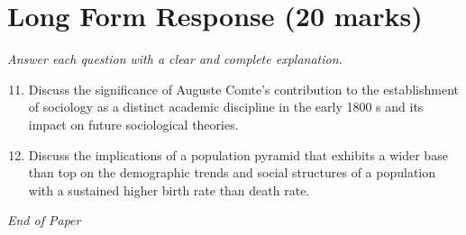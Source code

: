 \documentclass[12pt]{article}
\begin{document}
\section*{Long Form Response (20 marks)}
\textit{Answer each question with a clear and complete explanation.}
\begin{enumerate}[label=\arabic*.]
\setcounter{enumi}{10}
\item Discuss the significance of Auguste Comte's contribution to the establishment of sociology as a distinct academic discipline in the early 1800 s and its impact on future sociological theories.
\item Discuss the implications of a population pyramid that exhibits a wider base than top on the demographic trends and social structures of a population with a sustained higher birth rate than death rate.
\end{enumerate}

\vfill
\noindent\textit{End of Paper}
\end{document}
